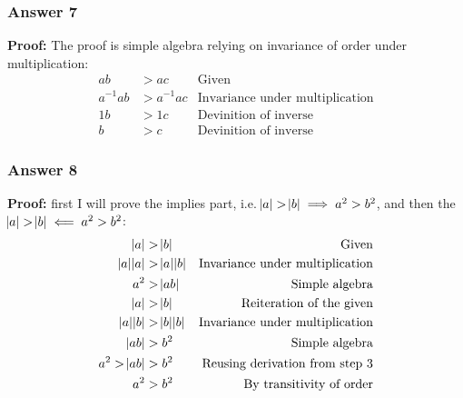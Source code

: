 \documentclass[11pt]{article}
\begin{document}
\subsubsection{Answer 7}
\label{sec-1-4-2}
\textbf{Proof:} The proof is simple algebra relying on invariance of order
under multiplication:
\begin{equation*}
  \begin{aligned}
    ab       &> ac      & \textrm{Given} \\
    a^{-1}ab &> a^{-1}ac & \textrm{Invariance under multiplication} \\
    1b       &> 1c      & \textrm{Devinition of inverse} \\
    b        &> c       & \textrm{Devinition of inverse}
  \end{aligned}
\end{equation*}

\subsubsection{Answer 8}
\label{sec-1-4-3}
\textbf{Proof:} first I will prove the implies part, i.e.
$\abs{a} > \abs{b} \implies a^2 > b^2$, and then the
$\abs{a} > \abs{b} \impliedby a^2 > b^2$:
\begin{equation*}
  \begin{aligned}
    \abs{a}        &> \abs{b}      & \textrm{Given} \\
    \abs{a}\abs{a} &> \abs{a}\abs{b} & \textrm{Invariance under multiplication} \\
    a^2            &> \abs{ab} & \textrm{Simple algebra} \\
    \abs{a}        &> \abs{b} & \textrm{Reiteration of the given} \\
    \abs{a}\abs{b} &> \abs{b}\abs{b} & \textrm{Invariance under multiplication} \\
    \abs{ab}       &> b^2 & \textrm{Simple algebra} \\
    a^2 > \abs{ab} &> b^2 & \textrm{Reusing derivation from step 3} \\
    a^2            &> b^2 & \textrm{By transitivity of order}
  \end{aligned}
\end{equation*}
\end{document}
